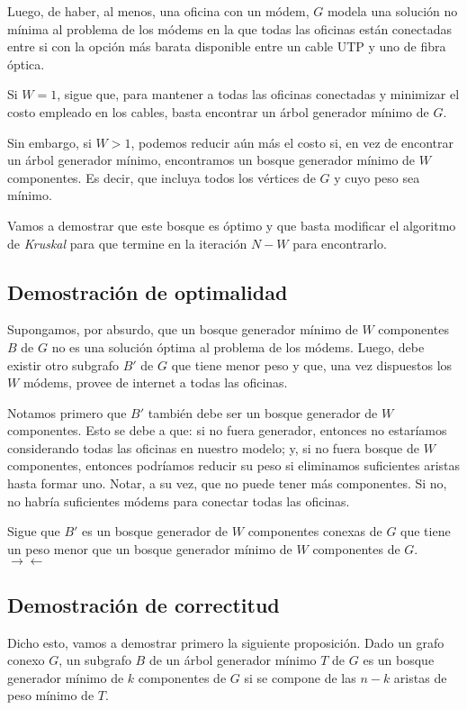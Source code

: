 Luego, de haber, al menos, una oficina con un módem, $G$ modela una solución no mínima al problema de los módems en la que todas las oficinas están conectadas entre si con la opción más barata disponible entre un cable UTP y uno de fibra óptica. 

Si $W = 1$, sigue que, para mantener a todas las oficinas conectadas y minimizar el costo empleado en los cables, basta encontrar un árbol generador mínimo de $G$. 

Sin embargo, si $W > 1$, podemos reducir aún más el costo si, en vez de encontrar un árbol generador mínimo, encontramos un bosque generador mínimo de $W$ componentes. Es decir, que incluya todos los vértices de $G$ y cuyo peso sea mínimo.

Vamos a demostrar que este bosque es óptimo y que basta modificar el algoritmo de \textit{Kruskal} para que termine en la iteración $N-W$ para encontrarlo.

\subsection{Demostración de optimalidad}

Supongamos, por absurdo, que un bosque generador mínimo de $W$ componentes $B$ de $G$ no es una solución óptima al problema de los módems. Luego, debe existir otro subgrafo $B'$ de $G$ que tiene menor peso y que, una vez dispuestos los $W$ módems, provee de internet a todas las oficinas. 

Notamos primero que $B'$ también debe ser un bosque generador de $W$ componentes. Esto se debe a que: si no fuera generador, entonces no estaríamos considerando todas las oficinas en nuestro modelo; y, si no fuera bosque de $W$ componentes, entonces podríamos reducir su peso si eliminamos suficientes aristas hasta formar uno. Notar, a su vez, que no puede tener más componentes. Si no, no habría suficientes módems para conectar todas las oficinas.

Sigue que $B'$ es un bosque generador de $W$ componentes conexas de $G$ que tiene un peso menor que un bosque generador mínimo de $W$ componentes  de $G$. $\rightarrow\leftarrow$

\subsection{Demostración de correctitud} Dicho esto, vamos a demostrar primero la siguiente proposición. Dado un grafo conexo $G$, un subgrafo $B$ de un árbol generador mínimo $T$ de $G$ es un bosque generador mínimo de $k$ componentes de $G$ si se compone de las $n - k$ aristas de peso mínimo de $T$.

